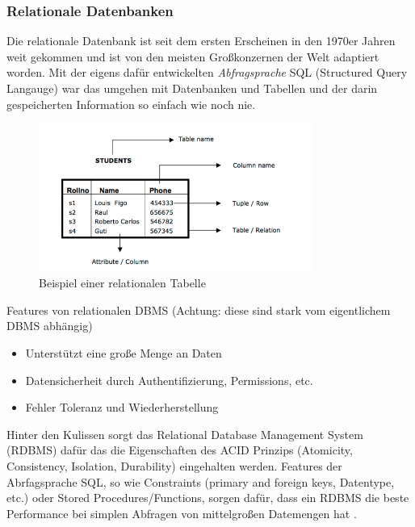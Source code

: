 \subsubsection{Relationale Datenbanken}
\label{subsec:relationaleDB}

Die relationale Datenbank ist seit dem ersten Erscheinen in den 1970er Jahren weit gekommen und ist von den meisten Großkonzernen der Welt adaptiert worden. Mit der eigens dafür entwickelten \textit{Abfragsprache} SQL (Structured Query Langauge) war das umgehen mit Datenbanken und Tabellen und der darin gespeicherten Information so einfach wie noch nie.

\begin{figure}[!htb]\centering
	\includegraphics[width=0.8\textwidth]{images/relationaleTabelle}
	\caption{Beispiel einer relationalen Tabelle}
\end{figure}

Features von relationalen DBMS (Achtung: diese sind stark vom eigentlichem DBMS abhängig)
\begin{itemize}
\item Unterstützt eine große Menge an Daten
\item Datensicherheit durch Authentifizierung, Permissions, etc.
\item Fehler Toleranz und Wiederherstellung
\end{itemize}

Hinter den Kulissen sorgt das Relational Database Management System (RDBMS) dafür das die Eigenschaften des ACID Prinzips (Atomicity, Consistency, Isolation, Durability) eingehalten werden. Features der Abrfagsprache SQL, so wie Constraints (primary and foreign keys, Datentype, etc.) oder Stored Procedures/Functions, sorgen dafür, dass ein RDBMS die beste Performance bei simplen Abfragen von mittelgroßen Datemengen hat \cite{MELD.CH2-relationaleDB.performacne}.

